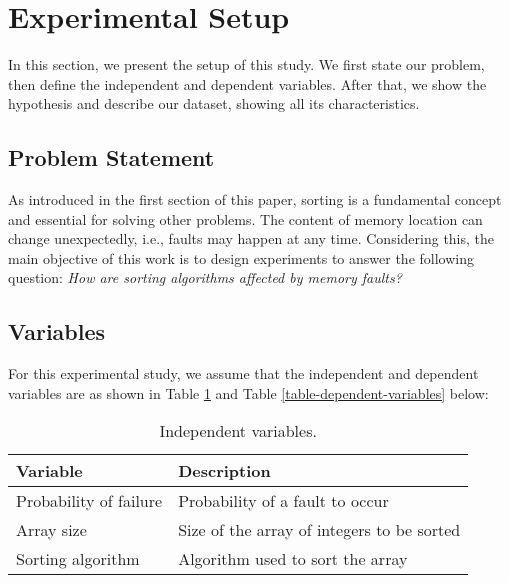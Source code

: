 \section{Experimental Setup}

In this section, we present the setup of this study. We first state our problem, then define the independent and dependent variables. After that, we show the hypothesis and describe our dataset, showing all its characteristics.

\subsection{Problem Statement}

As introduced in the first section of this paper, sorting is a fundamental concept and essential for solving other problems. The content of memory location can change unexpectedly, i.e., faults may happen at any time. Considering this, the main objective of this work is to design experiments to answer the following question: \textit{How are sorting algorithms affected by memory faults?}

\subsection{Variables}

For this experimental study, we assume that the independent and dependent variables are as shown in Table \ref{table-independent-variables} and Table \ref{table-dependent-variables} below:

\begin{table}[H]
    \caption{Independent variables.}
    \begin{center}
    \begin{tabular}{|l|l|}
    \hline
    \textbf{Variable} & \textbf{Description} \\
    \hline
    Probability of failure & Probability of a fault to occur \\
    \hline
    Array size & Size of the array of integers to be sorted \\
    \hline
    Sorting algorithm & Algorithm used to sort the array \\
    \hline
    \end{tabular}
    \label{table-independent-variables}
    \end{center}
\end{table}

